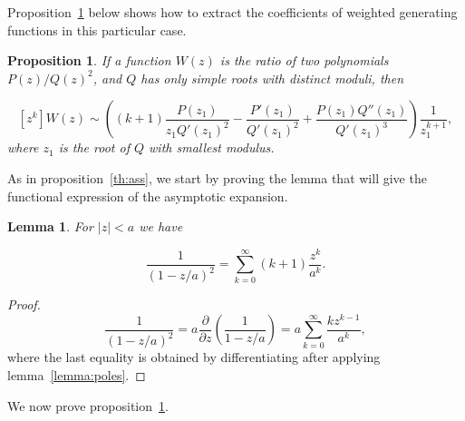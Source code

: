 \documentclass{article}
\newtheorem{lemma}{Lemma}
\newtheorem{proposition}{Proposition}
\begin{document}
Proposition~\ref{th:ass2} below shows how to extract the coefficients of
weighted generating functions in this particular case.




\begin{proposition}
\label{th:ass2}
If a function $W(z)$ is the ratio of two polynomials $P(z)/Q(z)^2$, and
$Q$ has only simple roots with distinct \textit{moduli}, then

\begin{equation}
\label{eq:ass2}
[z^k]W(z) \sim
\left( (k+1)\frac{P(z_1)}{z_1 Q'(z_1)^2} - \frac{P'(z_1)}{Q'(z_1)^2} +
\frac{P(z_1)Q''(z_1)}{Q'(z_1)^3} \right)
\frac{1}{z_1^{k+1}},
\end{equation}
where $z_1$ is the root of $Q$ with smallest \textit{modulus}.
\end{proposition}

As in proposition~\ref{th:ass}, we start by proving the lemma that will
give the functional expression of the asymptotic expansion.

\begin{lemma}
\label{lemma:poles2}
For $|z| < a$ we have

\begin{equation}
\label{eq:poles2}
\frac{1}{(1-z/a)^2} = \sum_{k=0}^\infty (k+1)\frac{z^k}{a^k}.
\end{equation}
\end{lemma}

\begin{proof}
\begin{equation*}
\frac{1}{(1-z/a)^2} = a \frac{\partial}{\partial z}
  \left( \frac{1}{1-z/a} \right)
= a \sum_{k=0}^\infty \frac{kz^{k-1}}{a^k},
\end{equation*}
where the last equality is obtained by differentiating after applying
lemma~\ref{lemma:poles}.
\end{proof}

We now prove proposition~\ref{th:ass2}.
\end{document}
